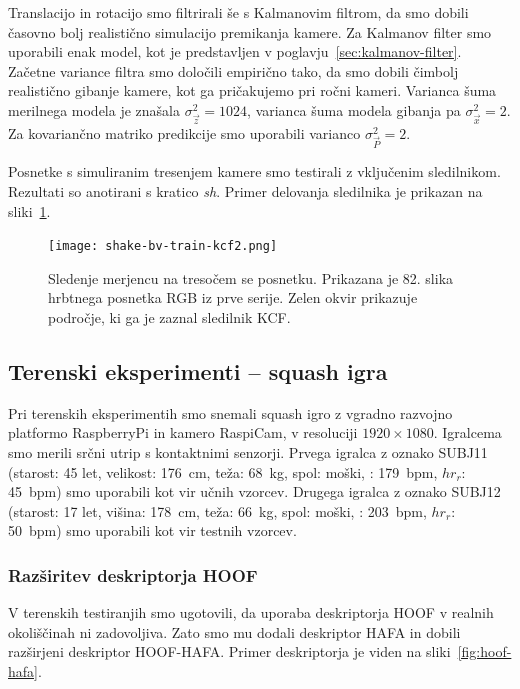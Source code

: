 Translacijo in rotacijo smo filtrirali še s Kalmanovim filtrom, da smo dobili časovno bolj realistično simulacijo premikanja kamere. Za Kalmanov filter smo uporabili enak model, kot je predstavljen v poglavju~\ref{sec:kalmanov-filter}. Začetne variance filtra smo določili empirično tako, da smo dobili čimbolj realistično gibanje kamere, kot ga pričakujemo pri ročni kameri. Varianca šuma merilnega modela je znašala $\sigma_\vec{z}^2=1024$, varianca šuma modela gibanja pa $\sigma_\vec{x}^2=2$. Za kovariančno matriko predikcije smo uporabili varianco $\sigma_\vec{P}^2=2$.

Posnetke s simuliranim tresenjem kamere smo testirali z vključenim sledilnikom. Rezultati so anotirani s kratico \textit{sh}. Primer delovanja sledilnika je prikazan na sliki~\ref{fig:vibracije}.

\begin{figure}[!htb]
	\centering
	\texttt{[image: shake-bv-train-kcf2.png]}
	\caption[Sledenje merjencu na tresočem se posnetku]{Sledenje merjencu na tresočem  se posnetku. Prikazana je 82. slika hrbtnega posnetka RGB iz prve serije. Zelen okvir prikazuje področje, ki ga je zaznal sledilnik KCF.}
	\label{fig:vibracije}
\end{figure} 








\subsection{Terenski eksperimenti -- squash igra}
Pri terenskih eksperimentih smo snemali squash igro z vgradno razvojno platformo RaspberryPi in kamero RaspiCam, v resoluciji  $1920 \times 1080$. Igralcema smo merili srčni utrip s kontaktnimi senzorji. Prvega igralca z oznako SUBJ11  (starost: 45 let, velikost: \SI{176}{\cm}, teža: \SI{68}{\kg}, spol: moški, \hrtmax: \SI{179}{bpm}, $hr_{r}$: \SI{45}{bpm}) smo uporabili kot vir učnih vzorcev. Drugega igralca z oznako SUBJ12 (starost: 17 let, višina: \SI{178}{\cm}, teža: \SI{66}{\kg}, spol: moški, \hrtmax: \SI{203}{bpm}, $hr_{r}$: \SI{50}{bpm}) smo uporabili kot vir testnih vzorcev.

\subsubsection{Razširitev deskriptorja HOOF}
V terenskih testiranjih smo ugotovili, da uporaba deskriptorja HOOF v realnih okoliščinah ni zadovoljiva. Zato smo mu dodali deskriptor HAFA in dobili razširjeni deskriptor HOOF-HAFA. Primer deskriptorja je viden na sliki~\ref{fig:hoof-hafa}.

